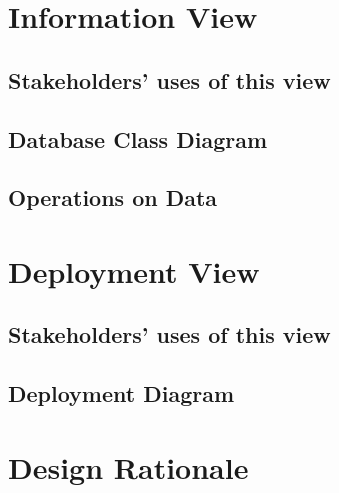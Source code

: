 \section{Information View}

\subsection{Stakeholders' uses of this view}

\subsection{Database Class Diagram}

\subsection{Operations on Data}

\section{Deployment View}

\subsection{Stakeholders' uses of this view}

\subsection{Deployment Diagram}

\section{Design Rationale}
